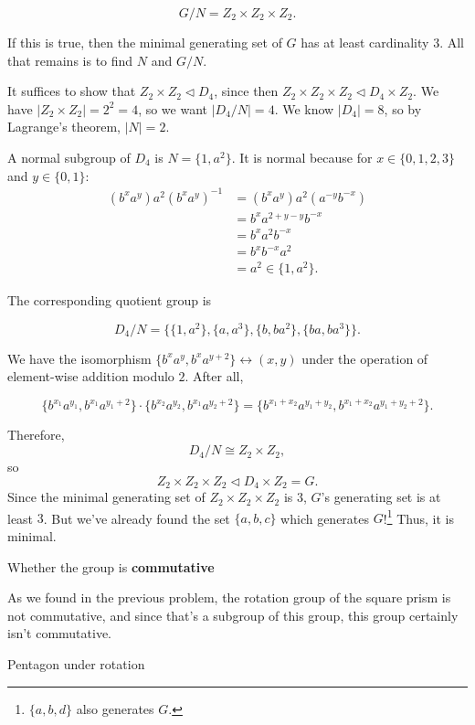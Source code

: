 \documentclass[../gatm_answers.tex]{subfiles}
\begin{document}
$$G/N = Z_2\times Z_2\times Z_2.$$

If this is true, then the minimal generating set of $G$ has at least cardinality $3$. All that remains is to find $N$ and $G/N$.

It suffices to show that $Z_2\times Z_2\triangleleft D_4$, since then $Z_2\times Z_2\times Z_2\triangleleft D_4\times Z_2.$ We have $|Z_2\times Z_2| = 2^2 = 4$, so we want $|D_4/N|=4$. We know $|D_4|=8$, so by Lagrange's theorem, $|N|=2$.

A normal subgroup of $D_4$ is $N=\{1,a^2\}$. It is normal because for $x\in\{0,1,2,3\}$ and $y\in\{0,1\}$:
\begin{align*}
(b^xa^y)a^2(b^xa^y)^{-1} &= (b^xa^y)a^2(a^{-y}b^{-x}) \\
&= b^xa^{2+y-y}b^{-x} \\
&= b^xa^2b^{-x} \\
&= b^xb^{-x}a^2 \\
&= a^2 \in \{1,a^2\}.
\end{align*}

The corresponding quotient group is

$$D_4/N = \{\{1,a^2\}, \{a,a^3\}, \{b,ba^2\}, \{ba, ba^3\}\}.$$

We have the isomorphism $\{b^xa^{y},b^xa^{y+2}\}\leftrightarrow (x,y)$ under the operation of element-wise addition modulo $2$. After all,

$$\{b^{x_1}a^{y_1},b^{x_1}a^{y_1+2}\}\cdot \{b^{x_2}a^{y_2},b^{x_1}a^{y_2+2}\} = \{b^{x_1+x_2}a^{y_1+y_2},b^{x_1+x_2}a^{y_1+y_2+2}\}.$$

Therefore, $$D_4/N \cong Z_2 \times Z_2,$$ so $$Z_2 \times Z_2 \times Z_2 \triangleleft D_4\times Z_2=G.$$ Since the minimal generating set of $Z_2\times Z_2\times Z_2$ is $3$, $G$'s generating set is at least $3$. But we've already found the set $\{a,b,c\}$ which generates $G$!\footnote{$\{a,b,d\}$ also generates $G$.} Thus, it is minimal.

\begin{inner_problem}
\item Whether the group is \textbf{commutative}
\end{inner_problem}

As we found in the previous problem, the rotation group of the square prism is not commutative, and since that's a subgroup of this group, this group certainly isn't commutative.

\begin{outer_problem}
\item Pentagon under rotation
\end{outer_problem}
\end{document}

